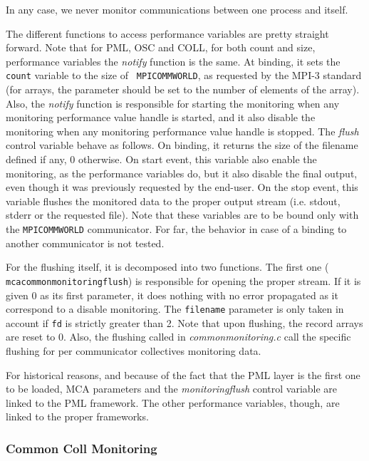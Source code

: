 In any case, we never monitor communications between one process and
itself.

The different functions to access \mpit{} performance variables are
pretty straight forward. Note that for PML, OSC and COLL, for both
count and size, performance variables the {\it notify} function is the
same. At binding, it sets the {\tt count} variable to the size of {\tt
  MPI\brkunds{}COMM\brkunds{}WORLD}, as requested by the MPI-3
standard (for arrays, the parameter should be set to the number of
elements of the array). Also, the {\it notify} function is responsible
for starting the monitoring when any monitoring performance value
handle is started, and it also disable the monitoring when any
monitoring performance value handle is stopped. The {\it flush}
control variable behave as follows. On binding, it returns the size of
the filename defined if any, 0 otherwise. On start event, this
variable also enable the monitoring, as the performance variables do,
but it also disable the final output, even though it was previously
requested by the end-user. On the stop event, this variable flushes
the monitored data to the proper output stream (i.e. stdout, stderr or
the requested file). Note that these variables are to be bound only
with the {\tt MPI\brkunds{}COMM\brkunds{}WORLD} communicator. For far,
the behavior in case of a binding to another communicator is not
tested.

For the flushing itself, it is decomposed into two functions. The
first one ({\tt
  mca\brkunds{}common\brkunds{}monitoring\brkunds{}flush}) is
responsible for opening the proper stream. If it is given 0 as its
first parameter, it does nothing with no error propagated as it
correspond to a disable monitoring. The {\tt filename} parameter is
only taken in account if {\tt fd} is strictly greater than 2. Note
that upon flushing, the record arrays are reset to 0. Also, the
flushing called in {\it common\brkunds{}monitoring.c} call the
specific flushing for per communicator collectives monitoring data.

For historical reasons, and because of the fact that the PML layer is
the first one to be loaded, MCA parameters and the {\it
  monitoring\brkunds{}flush} control variable are linked to the PML
framework. The other performance variables, though, are linked to the
proper frameworks.

\subsubsection{Common Coll Monitoring}
\label{subsubsec:TDI-common-coll}

